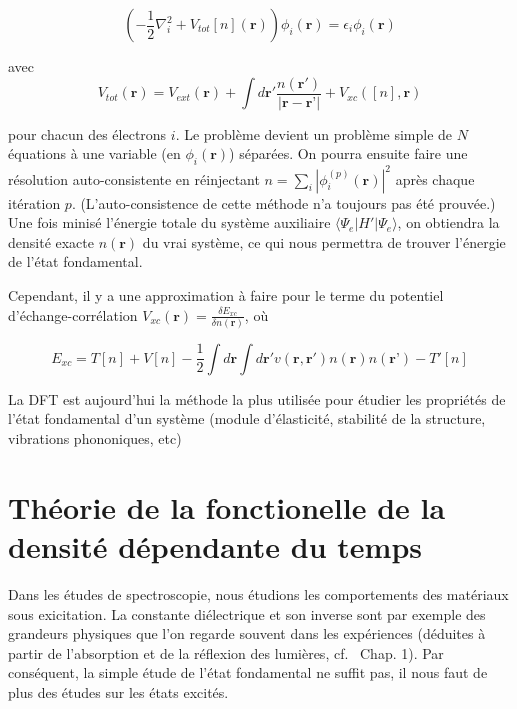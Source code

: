 \documentclass[12pt, french]{report}
\theoremstyle{theoreme}
\begin{document}
$$
(-\frac{1}{2}\nabla_i^2 + V_{tot}[n](\textbf{r}))\phi_i(\textbf{r}) = \epsilon_i \phi_i (\textbf{r})
$$

avec
\begin{equation}\label{Vtot}
V_{tot}(\textbf{r}) = V_{ext}(\textbf{r}) + \int d\textbf{r}' \frac{n(\textbf{r}')}{|\textbf{r} - \textbf{r'}|} + V_{xc}([n], \textbf{r})
\end{equation}

pour chacun des électrons $i$. Le problème devient un problème simple de $N$ équations à une variable (en $\phi_i(\textbf{r})$) séparées. On pourra ensuite faire une résolution auto-consistente en réinjectant $n = \sum_i |\phi_i^{(p)}(\textbf{r})|^2 $ après chaque itération $p$. (L'auto-consistence de cette méthode n'a toujours pas été prouvée.) Une fois minisé l'énergie totale du système auxiliaire $\langle \Psi_e | H' | \Psi_e \rangle $, on obtiendra la densité exacte $n(\textbf{r})$ du vrai système, ce qui nous permettra de trouver l'énergie de l'état fondamental.

Cependant, il y a une approximation à faire pour le terme du potentiel d'échange-corrélation $V_{xc}(\textbf{r}) = \frac{\delta E_{xc}}{\delta n(\textbf{r})}$, où

\begin{equation}
\label{eqn-exc}
  E_{xc} = T[n] + V[n] - \frac{1}{2}\int d\textbf{r}
  \int d\textbf{r}' v(\textbf{r}, \textbf{r}') n(\textbf{r}) n(\textbf{r'}) - T'[n]
\end{equation}

La DFT est aujourd'hui la méthode la plus utilisée pour étudier les propriétés de l'état fondamental d'un système (module d'élasticité, stabilité de la structure, vibrations phononiques, etc)~\cite{Mar04}

\section{Théorie de la fonctionelle de la densité dépendante du temps}\label{sec-TDDFT}
Dans les études de spectroscopie, nous étudions les comportements des matériaux sous exicitation. La constante diélectrique et son inverse sont par exemple des grandeurs physiques que l'on regarde souvent dans les expériences (déduites à partir de l'absorption et de la réflexion des lumières, cf.~\cite{Sot03} Chap. 1). Par conséquent, la simple étude de l'état fondamental ne suffit pas, il nous faut de plus des études sur les états excités.
\end{document}
